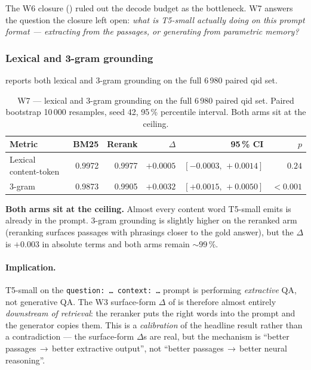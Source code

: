 \documentclass[11pt,a4paper]{article}
\newcommand{\fdev}{6\,980}
\newcommand{\bmtwofive}{BM25}
\newcommand{\barrow}{\,\allowbreak\ensuremath{\rightarrow}\allowbreak\,}
\begin{document}
The W6 closure () ruled out the decode budget
as the bottleneck.  W7 answers the question the closure left open:
\emph{what is T5-small actually doing on this prompt format ---
extracting from the passages, or generating from parametric
memory?}

\subsubsection{Lexical and 3-gram grounding}

 reports both lexical and 3-gram grounding
on the full \fdev{} paired qid set.

\begin{table}[H]
  \centering
  \caption{W7 --- lexical and 3-gram grounding on the full \fdev{}
  paired qid set.  Paired bootstrap 10\,000 resamples, seed 42,
  95\,\% percentile interval.  Both arms sit at the ceiling.}
  \label{tab:w7-lex-ngram}
  \begin{tabular}{lrrrrr}
    \toprule
    Metric             & \bmtwofive{} & Rerank & $\Delta$ & 95\,\% CI & $p$ \\
    \midrule
    Lexical content-token & 0.9972 & 0.9977 & $+0.0005$ & $[-0.0003,\,+0.0014]$ & $0.24$ \\
    3-gram                & 0.9873 & 0.9905 & $+0.0032$ & $[+0.0015,\,+0.0050]$ & $<\!0.001$ \\
    \bottomrule
  \end{tabular}
\end{table}

\textbf{Both arms sit at the ceiling.}  Almost every content word
T5-small emits is already in the prompt.  3-gram grounding is
slightly higher on the reranked arm
(reranking surfaces passages with phrasings closer to the gold
answer), but the $\Delta$ is $+0.003$ in absolute terms and both
arms remain $\sim\!99\,\%$.

\paragraph{Implication.}  T5-small on the
\texttt{question:\ \ldots\ context:\ \ldots} prompt is performing
\emph{extractive} QA, not generative QA.  The W3 surface-form
$\Delta$ of  is therefore almost entirely
\emph{downstream of retrieval}: the reranker puts the right words
into the prompt and the generator copies them.  This is a
\emph{calibration} of the headline result rather than a
contradiction --- the surface-form $\Delta$s are real, but the
mechanism is ``better passages\barrow{}better extractive output'',
not ``better passages\barrow{}better neural reasoning''.
\end{document}
